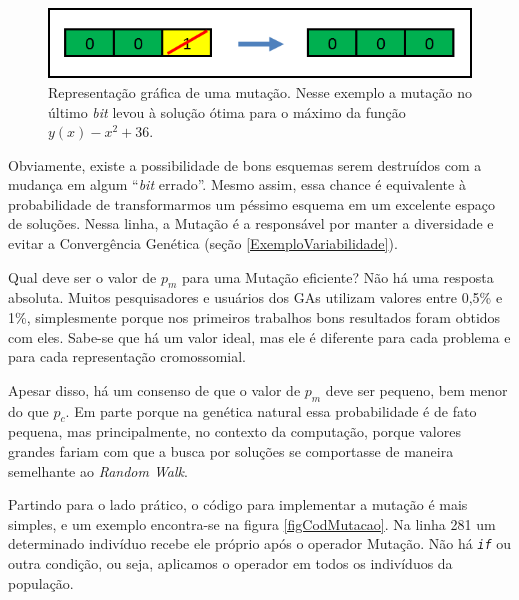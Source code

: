 	\begin{figure}[htp]
		\begin{center}
			\includegraphics[width=13cm]{figs/ga/Mutacao.png}
		\end{center}
		\caption{\label{figMutacao}Representação gráfica de uma mutação. Nesse exemplo a mutação no último \textit{bit} levou à solução ótima para o máximo da função $y(x) -x^2 + 36$.}
	\end{figure}
	
	Obviamente, existe a possibilidade de bons esquemas serem destruídos com a mudança em algum ``\textit{bit} errado''. Mesmo assim, essa chance é equivalente à probabilidade de transformarmos um péssimo esquema em um excelente espaço de soluções. Nessa linha, a Mutação é a responsável por manter a diversidade e evitar a Convergência Genética (seção \ref{ExemploVariabilidade}).
	
	Qual deve ser o valor de $p_m$ para uma Mutação eficiente? Não há uma resposta absoluta. Muitos pesquisadores e usuários dos GAs utilizam valores entre 0,5\% e 1\%, simplesmente porque nos primeiros trabalhos bons resultados foram obtidos com eles. Sabe-se que há um valor ideal, mas ele é diferente para cada problema e para cada representação cromossomial.
	
	Apesar disso, há um consenso de que o valor de $p_m$ deve ser pequeno, bem menor do que $p_c$. Em parte porque na genética natural essa probabilidade é de fato pequena, mas principalmente, no contexto da computação, porque valores grandes fariam com que a busca por soluções se comportasse de maneira semelhante ao \textit{Random Walk}.
	
	Partindo para o lado prático, o código para implementar a mutação é mais simples, e um exemplo encontra-se na figura \ref{figCodMutacao}. Na linha 281 um determinado indivíduo recebe ele próprio após o operador Mutação. Não há \textit{\texttt{if}} ou outra condição, ou seja, aplicamos o operador em todos os indivíduos da população.
	
